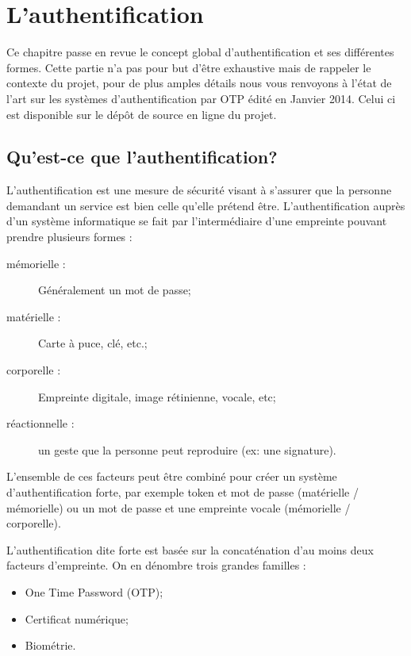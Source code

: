 \chapter{L'authentification}

	Ce chapitre passe en revue le concept global d'authentification et ses 
	différentes formes. Cette partie n'a pas pour but d'être exhaustive mais de 
	rappeler le contexte du projet, pour de plus amples détails nous vous 
	renvoyons à l'état de l'art sur les systèmes d'authentification par OTP édité 
	en Janvier 2014. Celui ci est disponible sur le dépôt de source en ligne du projet.

\section{Qu'est-ce que l'authentification?}

	L'authentification est une mesure de sécurité visant à s'assurer que la 
	personne demandant un service est bien celle qu'elle prétend être. 
	L'authentification auprès d'un système informatique se fait par 
	l'intermédiaire d'une empreinte pouvant prendre plusieurs formes :
	
	\begin{description}
		\item[mémorielle :] Généralement un mot de passe;
		\item[matérielle :] Carte à puce, clé, etc.;
		\item[corporelle :] Empreinte digitale, image rétinienne, vocale, etc;
		\item[réactionnelle :] un geste que la personne peut reproduire (ex: une 
		signature).
	\end{description}

	L'ensemble de ces facteurs peut être combiné pour créer un système 
	d'authentification forte, par exemple token et mot de passe (matérielle / mémorielle)
	ou 	un mot de passe et une empreinte vocale (mémorielle / corporelle).
	
	L'authentification dite forte est basée sur la concaténation d'au moins deux 
	facteurs d'empreinte. On en dénombre trois grandes familles :
	
	\begin{itemize}
		\item One Time Password (OTP);
		\item Certificat numérique;
		\item Biométrie.
	\end{itemize}

